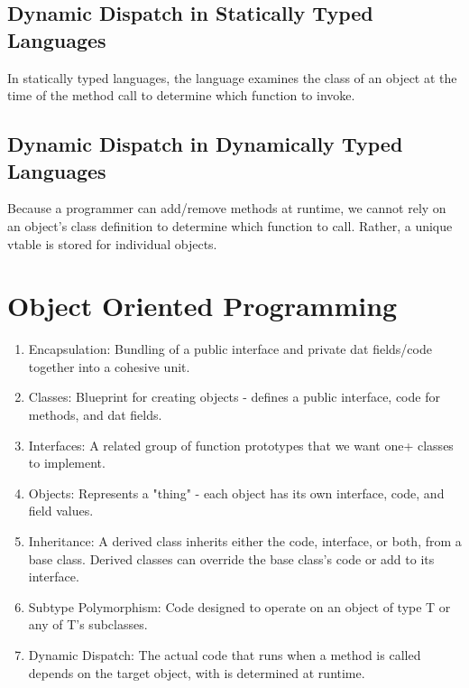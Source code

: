 \documentclass{article}
\begin{document}
\subsection{Dynamic Dispatch in Statically Typed Languages}
In statically typed languages, the language examines the class of an
object at the time of the method call to determine which function to
invoke.

\subsection{Dynamic Dispatch in Dynamically Typed Languages}
Because a programmer can add/remove methods at runtime, we cannot rely
on an object's class definition to determine which function to
call. Rather, a unique vtable is stored for individual objects.


\section{Object Oriented Programming}
\begin{enumerate}[label=(\roman*)]
\item Encapsulation: Bundling of a public interface and private dat
  fields/code together into a cohesive unit.
\item Classes: Blueprint for creating objects - defines a public
  interface, code for methods, and dat fields.
\item Interfaces: A related group of function prototypes that we want
  one+ classes to implement.
\item Objects: Represents a "thing" - each object has its own
  interface, code, and field values.
\item Inheritance: A derived class inherits either the code,
  interface, or both, from a base class. Derived classes can override
  the base class's code or add to its interface.
\item Subtype Polymorphism: Code designed to operate on an object of
  type T or any of T's subclasses.
\item Dynamic Dispatch: The actual code that runs when a method is
  called depends on the target object, with is determined at runtime.
\end{enumerate}
\end{document}

